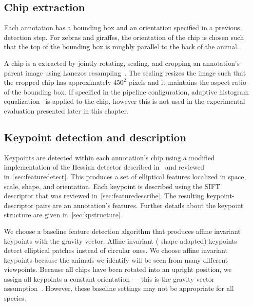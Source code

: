     \subsection{Chip extraction}

        Each annotation has a bounding box and an orientation specified in a previous detection step. For zebras
        and giraffes, the orientation of the chip is chosen such that the top of the bounding box is roughly
        parallel to the back of the animal.

        A chip is a extracted by jointly rotating, scaling, and cropping an annotation's parent image using Lanczos
        resampling~\cite{lanczos_applied_1988}. The scaling resizes the image such that the cropped chip has
        approximately $450^2$ pixels and it maintains the aspect ratio of the bounding box. If specified in the
        pipeline configuration, adaptive histogram equalization~\cite{pizer_adaptive_1987} is applied to the chip,
        however this is not used in the experimental evaluation presented later in this chapter.

    \subsection{Keypoint detection and description}

        Keypoints are detected within each annotation's chip using a modified implementation of the Hessian
        detector described in~\cite{perdoch_efficient_2009} and reviewed in~\cref{sec:featuredetect}. This produces
        a set of elliptical features localized in space, scale, shape, and orientation. Each keypoint is described
        using the SIFT~\cite{lowe_distinctive_2004} descriptor that was reviewed in~\cref{sec:featuredescribe}. The
        resulting keypoint-descriptor pairs are an annotation's features. Further details about the keypoint
        structure are given in~\cref{sec:kpstructure}.

        We choose a baseline feature detection algorithm that produces affine invariant keypoints with the gravity
        vector. Affine invariant (\ie{} shape adapted) keypoints detect elliptical patches instead of circular
        ones. We choose affine invariant keypoints because the animals we identify will be seen from many different
        viewpoints. Because all chips have been rotated into an upright position, we assign all keypoints a
        constant orientation --- this is the gravity vector assumption~\cite{perdoch_efficient_2009}. However,
        these baseline settings may not be appropriate for all species.

